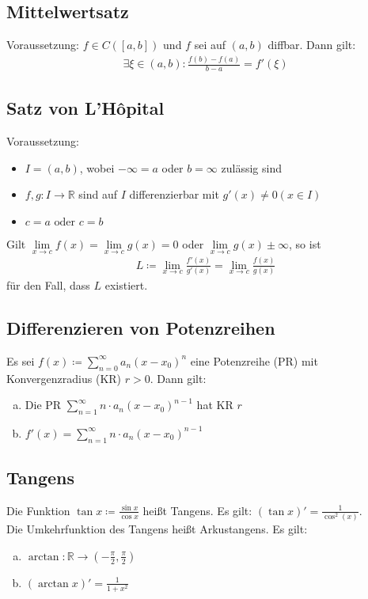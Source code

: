 \subsection{Mittelwertsatz}
Voraussetzung: $f \in C([a,b])$ und $f$ sei auf $(a,b)$ diffbar. Dann gilt: 
\begin{align*}
    \exists \xi \in (a,b): \frac{f(b) - f(a)}{b-a} = f'(\xi)
\end{align*}

\subsection{Satz von L'Hôpital}
Voraussetzung:
\begin{itemize}
    \item $I=(a,b)$, wobei $-\infty=a$ oder $b=\infty$ zulässig sind
    \item $f,g: I \to \mathbb{R}$ sind auf $I$ differenzierbar mit $g'(x) \neq 0 (x \in I)$
    \item $c=a \text{ oder } c=b$
\end{itemize}
Gilt $\lim \limits_{x \to c} f(x) = \lim \limits_{x \to c} g(x) = 0$ oder $\lim \limits_{x \to c} g(x) \pm \infty$, so ist 
\begin{align*}
    L \coloneqq \lim \limits_{x \to c} \frac{f'(x)}{g'(x)} =  \lim \limits_{x \to c} \frac{f(x)}{g(x)}
\end{align*}
für den Fall, dass $L$ existiert.

\subsection{Differenzieren von Potenzreihen}
Es sei $ f(x) \coloneqq \sum \limits_{n=0}^{\infty} a_n(x-x_0)^n$ eine Potenzreihe (PR) mit Konvergenzradius (KR) $r>0$. Dann gilt: \\
\begin{enumerate}[a)]
    \item Die PR $\sum \limits_{n=1}^{\infty} n \cdot a_n(x-x_0)^{n-1}$ hat KR $r$
    \item $f'(x) = \sum \limits_{n=1}^{\infty} n \cdot a_n(x-x_0)^{n-1}$
\end{enumerate}

\subsection{Tangens}
Die Funktion $\tan x \coloneqq \frac{\sin x}{\cos x}$ heißt Tangens. Es gilt: $(\tan x)' = \frac{1}{\cos^2(x)}$. \\
Die Umkehrfunktion des Tangens heißt Arkustangens. Es gilt: 
\begin{enumerate}[a)]
    \item $\arctan: \mathbb{R} \to (-\frac{\pi}{2},\frac{\pi}{2})$
    \item $(\arctan x)' = \frac{1}{1+x^2}$
\end{enumerate}


